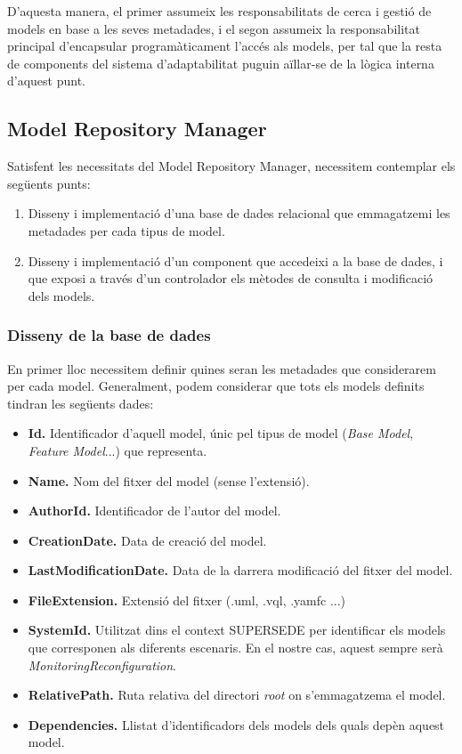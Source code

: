 D'aquesta manera, el primer assumeix les responsabilitats de cerca i gestió de models en base a les seves metadades, i el segon assumeix la responsabilitat principal d'encapsular programàticament l'accés als models, per tal que la resta de components del sistema d'adaptabilitat puguin aïllar-se de la lògica interna d'aquest punt.

\subsection{Model Repository Manager}

Satisfent les necessitats del Model Repository Manager, necessitem contemplar els següents punts:

\begin{enumerate}
\item Disseny i implementació d'una base de dades relacional que emmagatzemi les metadades per cada tipus de model.
\item Disseny i implementació d'un component que accedeixi a la base de dades, i que exposi a través d'un controlador els mètodes de consulta i modificació dels models.
\end{enumerate}

\subsubsection{Disseny de la base de dades}

En primer lloc necessitem definir quines seran les metadades que considerarem per cada model. Generalment, podem considerar que tots els models definits tindran les següents dades:

\begin{itemize}
\item \textbf{Id.} Identificador d'aquell model, únic pel tipus de model (\textit{Base Model}, \textit{Feature Model}...) que representa.
\item \textbf{Name.} Nom del fitxer del model (sense l'extensió).
\item \textbf{AuthorId.} Identificador de l'autor del model.
\item \textbf{CreationDate.} Data de creació del model.
\item \textbf{LastModificationDate.} Data de la darrera modificació del fitxer del model.
\item \textbf{FileExtension.} Extensió del fitxer (.uml, .vql, .yamfc ...)
\item \textbf{SystemId.} Utilitzat dins el context SUPERSEDE per identificar els models que corresponen als diferents escenaris. En el nostre cas, aquest sempre serà \textit{MonitoringReconfiguration}.
\item \textbf{RelativePath.} Ruta relativa del directori \textit{root} on s'emmagatzema el model.
\item \textbf{Dependencies.} Llistat d'identificadors dels models dels quals depèn aquest model.
\end{itemize}

